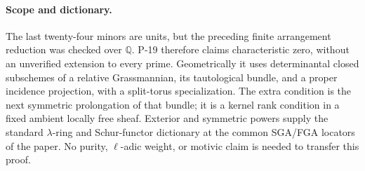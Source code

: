 \paragraph{Scope and dictionary.}
The last twenty-four minors are units, but the preceding finite
arrangement reduction was checked over $\mathbb Q$.  P-19 therefore
claims characteristic zero, without an unverified extension to every
prime.  Geometrically it uses determinantal closed subschemes of a
relative Grassmannian, its tautological bundle, and a proper incidence
projection, with a split-torus specialization.  The extra condition is
the next symmetric prolongation of that bundle; it is a kernel rank
condition in a fixed ambient locally free sheaf.  Exterior and symmetric
powers supply the standard $\lambda$-ring and Schur-functor dictionary
at the common SGA/FGA locators of the paper.  No purity, $\ell$-adic
weight, or motivic claim is needed to transfer this proof.

